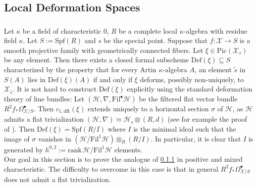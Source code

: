 \documentclass[letter, 11pt]{article}
\theoremstyle{plain}
\theoremstyle{definition}
\newcommand\tensor{{\otimes}}
\newcommand{\<}{\langle}
\renewcommand{\>}{\rangle}
\def\wt{\widetilde}
\newcommand{\sH}{\mathcal{H}}
\newcommand{\sX}{\mathcal{X}}
\newcommand{\Pic}{\mathrm{Pic}}
\newcommand{\Fil}{\mathrm{Fil}}
\newcommand{\Spf}{\mathrm{Spf}}
\newcommand{\Def}{\mathrm{Def}}
\newcommand{\dR}{\mathrm{dR}}
\begin{document}
\subsection{Local Deformation Spaces}


\subsubsection{}\label{sec: Def(xi) in char 0} Let $\kappa$ be a field of characteristic $0$, $R$ be a complete local $\kappa$-algebra with residue field $\kappa$. Let $S := \Spf(R)$ and $s$ be the special point. Suppose that $f : \sX \to S$ is a smooth projective family with geometrically connected fibers. Let $\xi \in \Pic(\sX_s)$ be any element. Then there exists a closed formal subscheme $\Def(\xi) \subseteq S$ characterized by the property that for every Artin $\kappa$-algebra $A$, an element $\wt{s}$ in $S(A)$ lies in $\Def(\xi)(A)$ if and only if $\xi$ deforms, possibly non-uniquely, to $\sX_{\wt{s}}$. It is not hard to construct $\Def(\xi)$ explicitly using the standard deformation theory of line bundles: Let $(\sH, \nabla, \Fil^\bullet \sH)$ be the filtered flat vector bundle $R^2 f_* \Omega^\bullet_{\sX/S}$. Then $c_{1, \dR}(\xi)$ extends uniquely to a horizontal section $\sigma$ of $\sH$, as $\sH$ admits a flat trivialization $(\sH, \nabla) \simeq \sH_s \tensor (R, d)$ (see for example the proof of \cite[Prop.~2.16]{BOBook}). Then $\Def(\xi) = \Spf(R/I)$ where $I$ is the minimal ideal such that the image of $\sigma$ vanishes in $(\sH / \Fil^1 \sH) \tensor_R (R/I)$. In particular, it is clear that $I$ is generated by $h^{0, 2} := \mathrm{rank\,} \sH / \Fil^1 \sH$ elements. \\

Our goal in this section is to prove the analogue of \ref{sec: Def(xi) in char 0} in positive and mixed characteristic. The difficulty to overcome in this case is that in general $R^2 f_* \Omega^\bullet_{\sX/S}$ does not admit a flat trivialization. 
\end{document}
